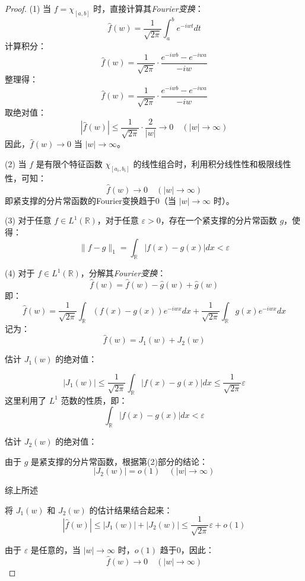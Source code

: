 \documentclass[12pt,a4paper]{article}
\theoremstyle{plain}
\theoremstyle{definition}
\theoremstyle{remark}
\begin{document}
	
	
	\begin{proof}
		(1) 当 \( f = \chi_{[a, b]} \) 时，直接计算其\emph{Fourier变换}：
		\[
		\hat{f}(w) = \frac{1}{\sqrt{2\pi}} \int_{a}^{b} e^{-i w t} dt
		\]
		计算积分：
		\[
		\hat{f}(w) = \frac{1}{\sqrt{2\pi}} \cdot \frac{e^{-i w b} - e^{-i w a}}{-i w}
		\]
		整理得：
		\[
		\hat{f}(w) = \frac{1}{\sqrt{2\pi}} \cdot \frac{e^{-i w b} - e^{-i w a}}{-i w}
		\]
		取绝对值：
		\[
		|\hat{f}(w)| \leq \frac{1}{\sqrt{2\pi}} \cdot \frac{2}{|w|} \to 0 \quad (|w| \to \infty)
		\]
		因此，\( \hat{f}(w) \to 0 \) 当 \( |w| \to \infty \)。
		
		(2) 当 \( f \) 是有限个特征函数 \( \chi_{[a_i, b_i]} \) 的线性组合时，利用积分线性性和极限线性性，可知：
		\[
		\hat{f}(w) \to 0 \quad (|w| \to \infty)
		\]
		即紧支撑的分片常函数的Fourier变换趋于0（当 \( |w| \to \infty \) 时）。
		
		(3) 对于任意 \( f \in L^1(\mathbb{R}) \)，对于任意 \( \varepsilon > 0 \)，存在一个紧支撑的分片常函数 \( g \)，使得：
		\[
		\|f - g\|_1 = \int_{\mathbb{R}} |f(x) - g(x)| dx < \varepsilon
		\]
		
		(4) 对于 \( f \in L^1(\mathbb{R}) \)，分解其\emph{Fourier变换}：
		\[
		\hat{f}(w) = \hat{f}(w) - \hat{g}(w) + \hat{g}(w)
		\]
		即：
		\[
		\hat{f}(w) = \frac{1}{\sqrt{2\pi}} \int_{\mathbb{R}} (f(x) - g(x)) e^{-i w x} dx + \frac{1}{\sqrt{2\pi}} \int_{\mathbb{R}} g(x) e^{-i w x} dx
		\]
		记为：
		\[
		\hat{f}(w) = J_1(w) + J_2(w)
		\]
		
		估计 \( J_1(w) \) 的绝对值：
		
		\[
		|J_1(w)| \leq \frac{1}{\sqrt{2\pi}} \int_{\mathbb{R}} |f(x) - g(x)| dx \leq \frac{1}{\sqrt{2\pi}} \varepsilon
		\]
		这里利用了 \( L^1 \) 范数的性质，即：
		\[
		\int_{\mathbb{R}} |f(x) - g(x)| dx < \varepsilon
		\]
		
		估计 \( J_2(w) \) 的绝对值：
		
		由于 \( g \) 是紧支撑的分片常函数，根据第(2)部分的结论：
		\[
		|J_2(w)| = o(1) \quad (|w| \to \infty)
		\]
		
		综上所述
		
		将 \( J_1(w) \) 和 \( J_2(w) \) 的估计结果结合起来：
		\[
		|\hat{f}(w)| \leq |J_1(w)| + |J_2(w)| \leq \frac{1}{\sqrt{2\pi}} \varepsilon + o(1)
		\]
		
		由于 \( \varepsilon \) 是任意的，当 \( |w| \to \infty \) 时，\( o(1) \) 趋于0，因此：
		\[
		\hat{f}(w) \to 0 \quad (|w| \to \infty)
		\]
		
	\end{proof}
	
	
	
\end{document}
